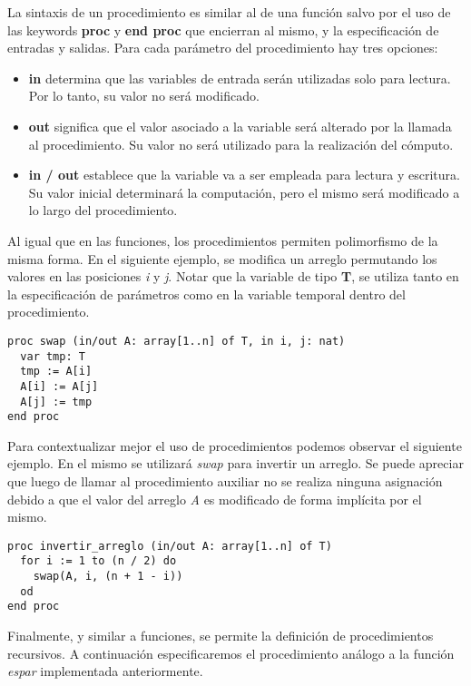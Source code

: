 \documentclass{article}
\newcommand{\gbajo}{\textunderscore}
\begin{document}
La sintaxis de un procedimiento es similar al de una función salvo por el uso de las keywords \textbf{proc} y \textbf{end proc} que encierran al mismo, y la especificación de entradas y salidas.
Para cada parámetro del procedimiento hay tres opciones:

\begin{itemize}
\item \textbf{in} determina que las variables de entrada serán utilizadas solo para lectura.
Por lo tanto, su valor no será modificado.
\item \textbf{out} significa que el valor asociado a la variable será alterado por la llamada al procedimiento.
Su valor no será utilizado para la realización del cómputo.
\item \textbf{in / out} establece que la variable va a ser empleada para lectura y escritura.
Su valor inicial determinará la computación, pero el mismo será modificado a lo largo del procedimiento.
\end{itemize}

Al igual que en las funciones, los procedimientos permiten polimorfismo de la misma forma.
En el siguiente ejemplo, se modifica un arreglo permutando los valores en las posiciones \textit{i} y \textit{j}.
Notar que la variable de tipo \textbf{T}, se utiliza tanto en la especificación de parámetros como en la variable temporal dentro del procedimiento.

\begin{lstlisting}
proc swap (in/out A: array[1..n] of T, in i, j: nat)
  var tmp: T
  tmp := A[i]
  A[i] := A[j]
  A[j] := tmp
end proc
\end{lstlisting}

Para contextualizar mejor el uso de procedimientos podemos observar el siguiente ejemplo.
En el mismo se utilizará \textit{swap} para invertir un arreglo.
Se puede apreciar que luego de llamar al procedimiento auxiliar no se realiza ninguna asignación debido a que el valor del arreglo \textit{A} es modificado de forma implícita por el mismo.

\begin{lstlisting}
proc invertir_arreglo (in/out A: array[1..n] of T)
  for i := 1 to (n / 2) do
    swap(A, i, (n + 1 - i))
  od
end proc
\end{lstlisting}

Finalmente, y similar a funciones, se permite la definición de procedimientos recursivos.
A continuación especificaremos el procedimiento análogo a la función \textit{es\gbajo par} implementada anteriormente.
\end{document}
